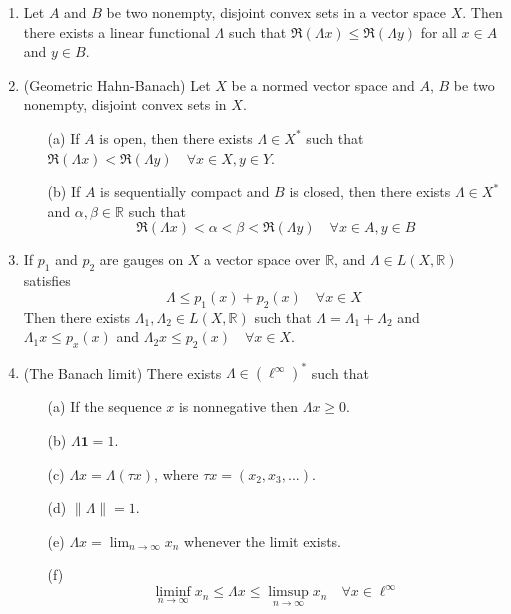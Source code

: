 \documentclass{article}
\theoremstyle{definition}
\newcommand{\RR}{\mathbb R}
\begin{document}
\begin{enumerate}
	\item Let $A$ and $B$ be two nonempty, disjoint convex sets in a vector space $X$.
		Then there exists a linear functional $\Lambda$ such that $\Re(\Lambda x) \leq \Re(\Lambda y)$ for all $x \in A$ and $y \in B$.

	\item (Geometric Hahn-Banach) Let $X$ be a normed vector space and $A$, $B$ be two nonempty, disjoint convex sets in $X$.
		\begin{enumerate}
			\item[(a)] If $A$ is open, then there exists $\Lambda \in X^*$ such that $\Re(\Lambda x) < \Re(\Lambda y) \quad \forall x \in X, y \in Y$.

			\item[(b)] If $A$ is sequentially compact and $B$ is closed, then there exists $\Lambda \in X^*$ and $\alpha, \beta \in \RR$ such that
				\[
					\Re(\Lambda x) < \alpha < \beta < \Re(\Lambda y) \quad \forall x \in A, y \in B
				\]
		\end{enumerate}

	\item If $p_1$ and $p_2$ are gauges on $X$ a vector space over $\RR$, and $\Lambda \in L(X, \RR)$ satisfies
		\[
			\Lambda \leq p_1(x) + p_2(x) \quad \forall x \in X
		\]
		Then there exists $\Lambda_1, \Lambda_2 \in L(X, \RR)$ such that $\Lambda = \Lambda_1 + \Lambda_2$ and $\Lambda_1 x \leq p_x(x)$ and $\Lambda_2 x \leq p_2(x) \quad \forall x \in X$.

	\item (The Banach limit) There exists $\Lambda \in (\ell^\infty)^*$ such that
		\begin{enumerate}
			\item[(a)] If the sequence $x$ is nonnegative then $\Lambda x \geq 0$.

			\item[(b)] $\Lambda \bm{1} = 1$.

			\item[(c)] $\Lambda x = \Lambda (\tau x)$, where $\tau x = (x_2, x_3, ...)$.

			\item[(d)] $\|\Lambda\| = 1$.

			\item[(e)] $\Lambda x = \lim_{n \to \infty} x_n$ whenever the limit exists.

			\item[(f)]
				\[
					\liminf_{n \to \infty} x_n \leq \Lambda x \leq \limsup_{n \to \infty} x_n \quad \forall x \in \ell^\infty
				\]
		\end{enumerate}


\end{enumerate}
\end{document}
